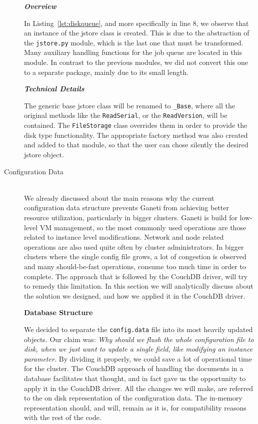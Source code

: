 \begin{description}
    \emph{\textbf{Overview}}

    In Listing~\ref{lst:diskqueue}, and more specifically in line 8, we observe
    that an instance of the jstore class is created. This is due to the
    abstraction of the \texttt{jstore.py} module, which is the last one that
    must be transformed. Many auxiliary handling functions for the job queue are
    located in this module. In contrast to the previous modules, we did not
    convert this one to a separate package, mainly due to its small length.

    \emph{\textbf{Technical Details}}

    The generic base jstore class will be renamed to \texttt{\_Base}, where all
    the original methods like the \texttt{ReadSerial}, or the
    \texttt{ReadVersion}, will be contained. The \texttt{FileStorage} class
    overrides them in order to provide the disk type functionality. The
    appropriate factory method was also created and added to that module, so
    that the user can chose silently the desired jstore object. \\
  \item[Configuration Data]\label{item:config} \hfill \\
    We already discussed about the main reasons why the current
    configuration data structure prevents Ganeti from achieving better resource
    utilization, particularly in bigger clusters. Ganeti is build for low-level
    VM management, so the most commonly used operations are those related to
    instance level modifications. Network and node related operations are also
    used quite often by cluster administrators. In bigger clusters where the
    single config file grows, a lot of congestion is observed and many
    should-be-fast operations, consume too much time in order to complete. The
    approach that is followed by the CouchDB driver, will try to remedy this
    limitation. In this section we will analytically discuss about the solution
    we designed, and how we applied it in the CouchDB driver.

    \textbf{Database Structure}

    We decided to separate the \texttt{config.data} file into
    its most heavily updated objects. Our claim was: \emph{Why should we flush
    the whole configuration file to disk, when we just want to update a single
    field, like modifying an instance parameter.} By dividing it properly,
    we could save a lot of operational time for the cluster.
    The CouchDB approach of handling the documents in a database facilitates
    that thought, and in fact gave us the opportunity to apply it in the CouchDB
    driver. All the changes we will make, are referred to the on disk
    representation of the configuration data. The in-memory
    representation should, and will, remain as it is, for compatibility reasons
    with the rest of the code.


\end{description}

